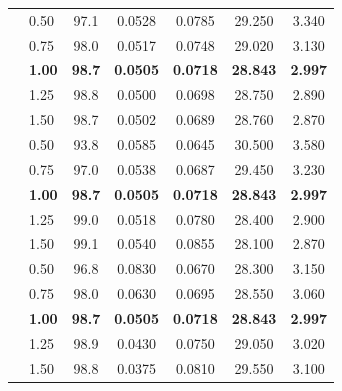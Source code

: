 \documentclass[11pt]{article}
\begin{document}
\begin{tcolorbox}[enhanced,breakable,colback=white,colframe=addblue!55,
coltext=addblue,fontupper=\color{addblue},boxrule=0.6pt,arc=2pt,
left=9pt,right=9pt,top=7pt,bottom=7pt]
{{\begin{tabular}{@{}llccccc@{}}
& 0.50          & 97.1          & 0.0528          & 0.0785          & 29.250          & 3.340 \\
& 0.75          & 98.0          & 0.0517          & 0.0748          & 29.020          & 3.130 \\
& \textbf{1.00} & \textbf{98.7} & \textbf{0.0505} & \textbf{0.0718} & \textbf{28.843} & \textbf{2.997} \\
& 1.25          & 98.8          & 0.0500          & 0.0698          & 28.750          & 2.890 \\
& 1.50          & 98.7          & 0.0502          & 0.0689          & 28.760          & 2.870 \\
\midrule

& 0.50          & 93.8          & 0.0585          & 0.0645          & 30.500          & 3.580 \\
& 0.75          & 97.0          & 0.0538          & 0.0687          & 29.450          & 3.230 \\
& \textbf{1.00} & \textbf{98.7} & \textbf{0.0505} & \textbf{0.0718} & \textbf{28.843} & \textbf{2.997} \\
& 1.25          & 99.0          & 0.0518          & 0.0780          & 28.400          & 2.900 \\
& 1.50          & 99.1          & 0.0540          & 0.0855          & 28.100          & 2.870 \\
\midrule

& 0.50          & 96.8          & 0.0830          & 0.0670          & 28.300          & 3.150 \\
& 0.75          & 98.0          & 0.0630          & 0.0695          & 28.550          & 3.060 \\
& \textbf{1.00} & \textbf{98.7} & \textbf{0.0505} & \textbf{0.0718} & \textbf{28.843} & \textbf{2.997} \\
& 1.25          & 98.9          & 0.0430          & 0.0750          & 29.050          & 3.020 \\
& 1.50          & 98.8          & 0.0375          & 0.0810          & 29.550          & 3.100 \\
\midrule


\end{tabular}}}
\end{tcolorbox}
\end{document}
